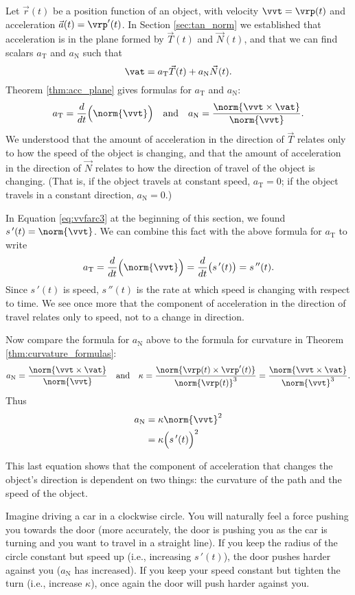 Let $\vec r(t)$ be a position function of an object, with velocity $\vvt = \vrp(t)$ and acceleration $\vec a(t)=\vrp'(t)$. In Section \ref{sec:tan_norm} we established that acceleration is in the plane formed by $\vec T(t)$ and $\vec N(t)$, and that we can find scalars $a_\text{T}$ and $a_\text{N}$ such that 
\[
\vat = a_\text{T}\vec T(t) + a_\text{N}\vec N(t).
\]
Theorem \ref{thm:acc_plane} gives formulas for $a_\text{T}$ and $a_\text{N}$:
\[
a_\text{T} = \frac{d}{dt}\Big(\norm{\vvt}\Big) \quad \text{and} \quad a_\text{N} = \frac{\norm{\vvt\times \vat}}{\norm{\vvt}}.
\]
We understood that the amount of acceleration in the direction of $\vec T$ relates only to how the speed of the object is changing, and that the amount of acceleration in the direction of $\vec N$ relates to how the direction of travel of the object is changing. (That is, if the object travels at constant speed, $a_\text{T}=0$; if the object travels in a constant direction, $a_\text{N}=0$.)


In Equation \eqref{eq:vvfarc3} at the beginning of this section, we found
$s\,'(t) = \norm{\vvt}$. We can combine this fact with the above formula for $a_\text{T}$ to write
\[
a_\text{T} = \frac{d}{dt}\Big(\norm{\vvt}\Big) = \frac{d}{dt}\big( s\,'(t)\big) = s\,''(t).
\]
Since $s\,'(t)$ is speed, $s\,''(t)$ is the rate at which speed is changing with respect to time. We see once more that the component of acceleration in the direction of travel relates only to speed, not to a change in direction.

Now compare the formula for $a_\text{N}$ above to the formula for curvature in Theorem \ref{thm:curvature_formulas}:
\[
a_\text{N} = \frac{\norm{\vvt\times \vat}}{\norm{\vvt}}\quad \text{and}\quad \kappa = \frac{\norm{\vrp(t)\times\vrp'(t)}}{\norm{\vrp(t)}^3}=\frac{\norm{\vvt\times \vat}}{\norm{\vvt}^3} .
\]
Thus 
\begin{align}
a_\text{N} &= \kappa \norm{\vvt}^2 \label{eq:curvature_an}\\
				&= \kappa\Big(s\,'(t)\Big)^2\notag
\end{align}

This last equation shows that the component of acceleration that changes the object's direction is dependent on two things: the curvature of the path and the speed of the object.

Imagine driving a car in a clockwise circle. You will naturally feel a force pushing you towards the door (more accurately, the door is pushing you as the car is turning and you want to travel in a straight line). If you keep the radius of the circle constant but speed up (i.e., increasing $s\,'(t)$), the door pushes harder against you ($a_\text{N}$ has increased). If you keep your speed constant but tighten the turn (i.e., increase $\kappa$), once again the door will push harder against you.

